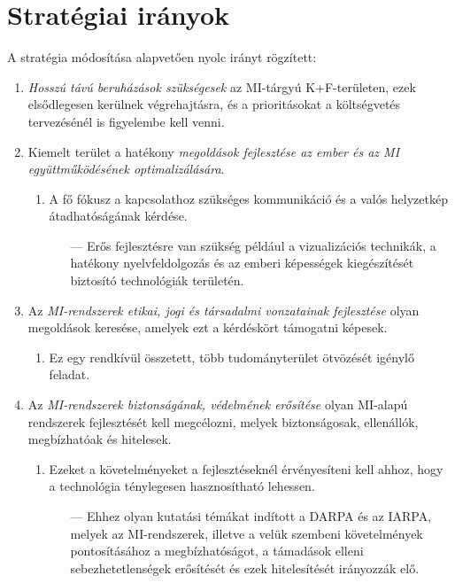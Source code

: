 \documentclass[
]{thesis-ekf}
\theoremstyle{definition}
\theoremstyle{remark}
\begin{document}
\section{Stratégiai irányok}
A stratégia módosítása alapvetően nyolc irányt rögzített:

\begin{enumerate}
	\item \emph{Hosszú távú beruházások szükségesek} az MI-tárgyú K+F-területen, ezek elsődlegesen kerülnek végrehajtásra, és a prioritásokat a költségvetés tervezésénél is figyelembe kell venni.
	\item Kiemelt terület a hatékony \emph{megoldások fejlesztése az ember és az MI együttműködésének optimalizálására}.
	\begin{enumerate}
		\item A fő fókusz a kapcsolathoz szükséges kommunikáció és a valós helyzetkép átadhatóságának kérdése.
		\begin{enumerate}
			\item[---] Erős fejlesztésre van szükség például a vizualizációs technikák, a hatékony nyelvfeldolgozás és az emberi képességek kiegészítését biztosító technológiák területén.
		\end{enumerate}
	\end{enumerate}
	\item Az \emph{MI-rendszerek etikai, jogi és társadalmi vonzatainak fejlesztése} olyan megoldások keresése, amelyek ezt a kérdéskört támogatni képesek.
	\begin{enumerate}
		\item Ez egy rendkívül összetett, több tudományterület ötvözését igénylő feladat.
	\end{enumerate}
	\item Az \emph{MI-rendszerek biztonságának, védelmének erősítése} olyan MI-alapú rendszerek fejlesztését kell megcélozni, melyek biztonságosak, ellenállók, megbízhatóak és hitelesek.
	\begin{enumerate}
		\item Ezeket a követelményeket a fejlesztéseknél érvényesíteni kell ahhoz, hogy a technológia ténylegesen hasznosítható lehessen.
		\begin{enumerate}
			\item[---] Ehhez olyan kutatási témákat indított a DARPA és az IARPA, melyek az MI-rendszerek, illetve a velük szembeni követelmények pontosításához a megbízhatóságot, a támadások elleni sebezhetetlenségek erősítését és ezek hitelesítését irányozzák elő.
		\end{enumerate}

\end{enumerate}
\end{enumerate}
\end{document}
